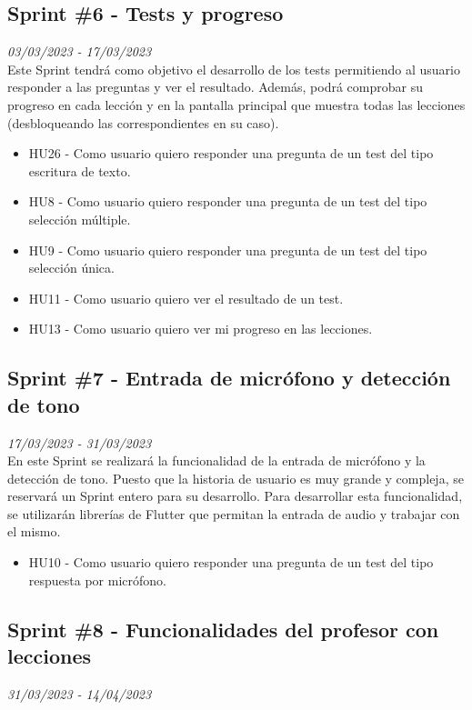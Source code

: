 \subsection{Sprint \#6 - Tests y progreso}
\textit{03/03/2023   -   17/03/2023}\\

Este Sprint tendrá como objetivo el desarrollo de los tests permitiendo al usuario responder a las preguntas y ver el resultado.
Además, podrá comprobar su progreso en cada lección y en la pantalla principal que muestra todas las lecciones (desbloqueando las correspondientes en su caso).
\begin{itemize}
    \item HU26 - Como usuario quiero responder una pregunta de un test del tipo escritura de texto.
    \item HU8 - Como usuario quiero responder una pregunta de un test del tipo selección múltiple.
    \item HU9 - Como usuario quiero responder una pregunta de un test del tipo selección única.
    \item HU11 - Como usuario quiero ver el resultado de un test.
    \item HU13 - Como usuario quiero ver mi progreso en las lecciones.

\end{itemize}

\subsection{Sprint \#7 - Entrada de micrófono y detección de tono}
\textit{17/03/2023   -   31/03/2023}\\

En este Sprint se realizará la funcionalidad de la entrada de micrófono y la detección de tono. Puesto que la historia de usuario es muy grande y compleja, se reservará
un Sprint entero para su desarrollo. Para desarrollar esta funcionalidad, se utilizarán librerías de Flutter que permitan la entrada de audio y trabajar con el mismo.
\begin{itemize}
    \item HU10 - Como usuario quiero responder una pregunta de un test del tipo respuesta por micrófono.
\end{itemize}

\newpage
\subsection{Sprint \#8 - Funcionalidades del profesor con lecciones}
\textit{31/03/2023   -   14/04/2023}\\

